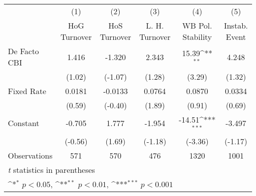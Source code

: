 \begin{table}[htbp]\centering
\def\sym#1{\ifmmode^{#1}\else\(^{#1}\)\fi}
\caption{\label{hiKfivs2}}
\begin{tabular}{l*{5}{c}}
\toprule
                                        &\multicolumn{1}{c}{(1)}&\multicolumn{1}{c}{(2)}&\multicolumn{1}{c}{(3)}&\multicolumn{1}{c}{(4)}&\multicolumn{1}{c}{(5)}\\
                                        &\multicolumn{1}{c}{HoG Turnover}&\multicolumn{1}{c}{HoS Turnover}&\multicolumn{1}{c}{L. H. Turnover}&\multicolumn{1}{c}{WB Pol. Stability}&\multicolumn{1}{c}{Instab. Event}\\
\midrule
De Facto CBI                            &    1.416         &   -1.320         &    2.343         &    15.39\sym{**} &    4.248         \\
                                        &   (1.02)         &  (-1.07)         &   (1.28)         &   (3.29)         &   (1.32)         \\
\addlinespace
Fixed Rate                              &   0.0181         &  -0.0133         &   0.0764         &   0.0870         &   0.0334         \\
                                        &   (0.59)         &  (-0.40)         &   (1.89)         &   (0.91)         &   (0.69)         \\
\addlinespace
Constant                                &   -0.705         &    1.777         &   -1.954         &   -14.51\sym{***}&   -3.497         \\
                                        &  (-0.56)         &   (1.69)         &  (-1.18)         &  (-3.36)         &  (-1.17)         \\
\midrule
Observations                            &      571         &      570         &      476         &     1320         &     1001         \\
\bottomrule
\multicolumn{6}{l}{\footnotesize \textit{t} statistics in parentheses}\\
\multicolumn{6}{l}{\footnotesize \sym{*} \(p<0.05\), \sym{**} \(p<0.01\), \sym{***} \(p<0.001\)}\\
\end{tabular}
\end{table}
